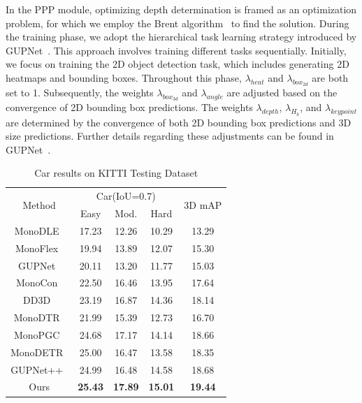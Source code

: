 \documentclass[journal]{IEEEtran}
\begin{document}
	In the PPP module, optimizing depth determination is framed as an optimization problem, for which we employ the Brent algorithm~\cite{brent} to find the solution. During the training phase, we adopt the hierarchical task learning strategy introduced by GUPNet~\cite{gupnet}. This approach involves training different tasks sequentially. Initially, we focus on training the 2D object detection task, which includes generating 2D heatmaps and bounding boxes. Throughout this phase, $\lambda_{heat}$ and $\lambda_{box_{2d}}$ are both set to 1. Subsequently, the weights $\lambda_{box_{3d}}$ and $\lambda_{angle}$ are adjusted based on the convergence of 2D bounding box predictions. The weights $\lambda_{depth}$, $\lambda_{H_k}$, and $\lambda_{keypoint}$ are determined by the convergence of both 2D bounding box predictions and 3D size predictions. Further details regarding these adjustments can be found in GUPNet~\cite{gupnet}.
\begin{table}[]
	\centering
	\caption{{Car results on KITTI Testing Dataset}}
	\label{tab:kitti_test}
	{%
		\begin{tabular}{ccccc}
			\toprule%
			\multirow{2}{*}{{Method}} & \multicolumn{3}{c}{{Car(IoU=0.7)}}                & \multirow{2}{*}{{3D mAP}} \\ \cline{2-4}
			& {Easy}           & {Mod.}           & {Hard}           &                         \\ 
			\midrule%
			{MonoDLE~\cite{monodle}}			& {17.23}	& {12.26}	& {10.29}	& {13.29}	\\
			{MonoFlex~\cite{monoflex}}			& {19.94}	& {13.89}   & {12.07}   & {15.30}	\\
			{GUPNet~\cite{gupnet}}            	& {20.11}   & {13.20}   & {11.77}   & {15.03}	\\
			{MonoCon~\cite{monocon}}         	& {22.50}   & {16.46}   & {13.95}   & {17.64}	\\
			{DD3D~\cite{dd3d}}         			& {23.19}   & {16.87}   & {14.36}   & {18.14}	\\
			{MonoDTR~\cite{monodtr}}         	& {21.99}   & {15.39}   & {12.73}   & {16.70}	\\
			{MonoPGC~\cite{monopgc}}         	& {24.68}   & {17.17}   & {14.14}   & {18.66}	\\
			{MonoDETR~\cite{monodetr}} & 25.00 & 16.47 & 13.58 & 18.35
			\\
			{GUPNet++~\cite{gupnet++}}         	& {24.99}   & {16.48}   & {14.58}   & {18.68}	\\
			{Ours}         						& {\textbf{25.43}} 		& {\textbf{17.89}} 		& {\textbf{15.01}} 		& {\textbf{19.44}}   	\\ 
			\bottomrule%
		\end{tabular}
	}
\end{table}
\end{document}
